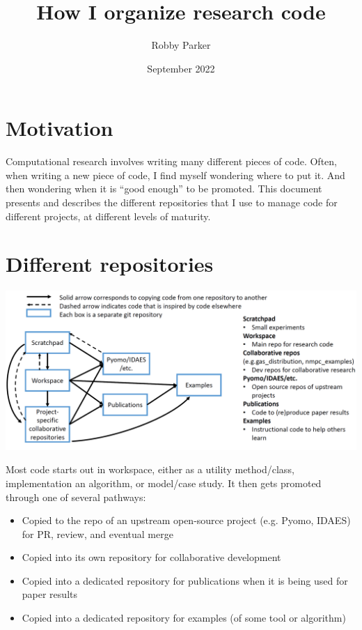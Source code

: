 \documentclass{article}
\title{How I organize research code}
\author{Robby Parker}
\date{September 2022}
\begin{document}
\maketitle

\section{Motivation}
Computational research involves writing many different pieces of code.
Often, when writing a new piece of code, I find myself wondering where
to put it. And then wondering when it is ``good enough'' to be promoted.
This document presents and describes the different repositories that I
use to manage code for different projects, at different levels of
maturity.

\section{Different repositories}

\hspace{-2cm}\includegraphics[width=16cm]{repo_diagram}

Most code starts out in workspace, either as a utility method/class,
implementation an algorithm, or model/case study.
It then gets promoted through one of several pathways:
\begin{itemize}
  \item Copied to the repo of an upstream open-source project (e.g. Pyomo,
    IDAES) for PR, review, and eventual merge
  \item Copied into its own repository for collaborative development
  \item Copied into a dedicated repository for publications when it is
    being used for paper results
  \item Copied into a dedicated repository for examples (of some tool
    or algorithm)
\end{itemize}
\end{document}
